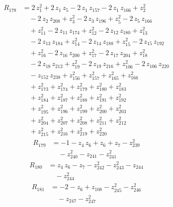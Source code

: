 \begin{equation*}\begin{aligned}
R_{178}&=2\,z_{1}^{2} +2\,z_{1}\,z_{5} -2\,z_{1}\,z_{157} -2\,z_{1}\,z_{166} +z_{2}^{2} \\
&\quad -2\,z_{2}\,z_{208} +z_{3}^{2} -2\,z_{3}\,z_{196} +z_{5}^{2} -2\,z_{5}\,z_{166} \\
&\quad +z_{11}^{2} -2\,z_{11}\,z_{174} +z_{12}^{2} -2\,z_{12}\,z_{180} +z_{13}^{2} \\
&\quad -2\,z_{13}\,z_{184} +z_{14}^{2} -2\,z_{14}\,z_{188} +z_{15}^{2} -2\,z_{15}\,z_{192} \\
&\quad +z_{16}^{2} -2\,z_{16}\,z_{200} +z_{17}^{2} -2\,z_{17}\,z_{204} +z_{18}^{2} \\
&\quad -2\,z_{18}\,z_{212} +z_{19}^{2} -2\,z_{19}\,z_{216} +z_{106}^{2} -2\,z_{106}\,z_{220} \\
&\quad -z_{152}\,z_{238} +z_{156}^{2} +z_{157}^{2} +z_{165}^{2} +z_{166}^{2} \\
&\quad +z_{173}^{2} +z_{174}^{2} +z_{179}^{2} +z_{180}^{2} +z_{183}^{2} \\
&\quad +z_{184}^{2} +z_{187}^{2} +z_{188}^{2} +z_{191}^{2} +z_{192}^{2} \\
&\quad +z_{195}^{2} +z_{196}^{2} +z_{199}^{2} +z_{200}^{2} +z_{203}^{2} \\
&\quad +z_{204}^{2} +z_{207}^{2} +z_{208}^{2} +z_{211}^{2} +z_{212}^{2} \\
&\quad +z_{215}^{2} +z_{216}^{2} +z_{219}^{2} +z_{220}^{2}
\end{aligned}\end{equation*}
\begin{equation*}\begin{aligned}
R_{179}&=-1 -z_{4}\,z_{6} +z_{6} +z_{7} -z_{239}^{2} \\
&\quad -z_{240}^{2} -z_{241} -z_{241}^{2}
\end{aligned}\end{equation*}
\begin{equation*}\begin{aligned}
R_{180}&=z_{4}\,z_{6} -z_{7} -z_{242}^{2} -z_{243}^{2} -z_{244} \\
&\quad -z_{244}^{2}
\end{aligned}\end{equation*}
\begin{equation*}\begin{aligned}
R_{181}&=-2 -z_{6} +z_{108} -z_{245}^{2} -z_{246}^{2} \\
&\quad -z_{247} -z_{247}^{2}
\end{aligned}\end{equation*}
